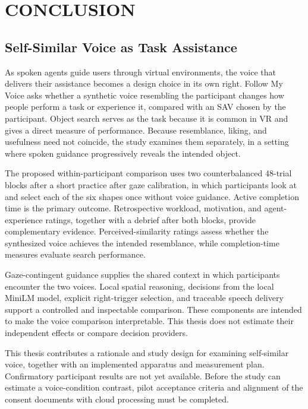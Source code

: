 \chapter{CONCLUSION}
\label{ch:conclusion}
\section{Self-Similar Voice as Task Assistance}
As spoken agents guide users through virtual environments, the voice that delivers their assistance becomes a design choice in its own right. Follow My Voice asks whether a synthetic voice resembling the participant changes how people perform a task or experience it, compared with an SAV chosen by the participant. Object search serves as the task because it is common in VR and gives a direct measure of performance. Because resemblance, liking, and usefulness need not coincide, the study examines them separately, in a setting where spoken guidance progressively reveals the intended object.

The proposed within-participant comparison uses two counterbalanced 48-trial blocks after a short practice after gaze calibration, in which participants look at and select each of the six shapes once without voice guidance. Active completion time is the primary outcome. Retrospective workload, motivation, and agent-experience ratings, together with a debrief after both blocks, provide complementary evidence. Perceived-similarity ratings assess whether the synthesized voice achieves the intended resemblance, while completion-time measures evaluate search performance.

Gaze-contingent guidance supplies the shared context in which participants encounter the two voices. Local spatial reasoning, decisions from the local MiniLM model, explicit right-trigger selection, and traceable speech delivery support a controlled and inspectable comparison. These components are intended to make the voice comparison interpretable. This thesis does not estimate their independent effects or compare decision providers.

This thesis contributes a rationale and study design for examining self-similar voice, together with an implemented apparatus and measurement plan. Confirmatory participant results are not yet available. Before the study can estimate a voice-condition contrast, pilot acceptance criteria and alignment of the consent documents with cloud processing must be completed.

